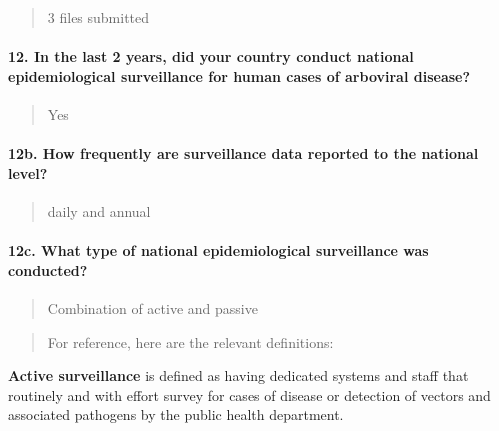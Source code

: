 \documentclass[
]{article}
\begin{document}
\begin{quote}
3 files submitted
\end{quote}

\hypertarget{in-the-last-2-years-did-your-country-conduct-national-epidemiological-surveillance-for-human-cases-of-arboviral-disease}{%
\paragraph{12. In the last 2 years, did your country conduct national
epidemiological surveillance for human cases of arboviral
disease?}\label{in-the-last-2-years-did-your-country-conduct-national-epidemiological-surveillance-for-human-cases-of-arboviral-disease}}

\begin{quote}
Yes
\end{quote}

\hypertarget{b.-how-frequently-are-surveillance-data-reported-to-the-national-level}{%
\paragraph{12b. How frequently are surveillance data reported to the
national
level?}\label{b.-how-frequently-are-surveillance-data-reported-to-the-national-level}}

\begin{quote}
daily and annual
\end{quote}

\hypertarget{c.-what-type-of-national-epidemiological-surveillance-was-conducted}{%
\paragraph{12c. What type of national epidemiological surveillance was
conducted?}\label{c.-what-type-of-national-epidemiological-surveillance-was-conducted}}

\begin{quote}
Combination of active and passive
\end{quote}

\begin{quote}
For reference, here are the relevant definitions:
\end{quote}

\textbf{Active surveillance} is defined as having dedicated systems and
staff that routinely and with effort survey for cases of disease or
detection of vectors and associated pathogens by the public health
department.
\end{document}
